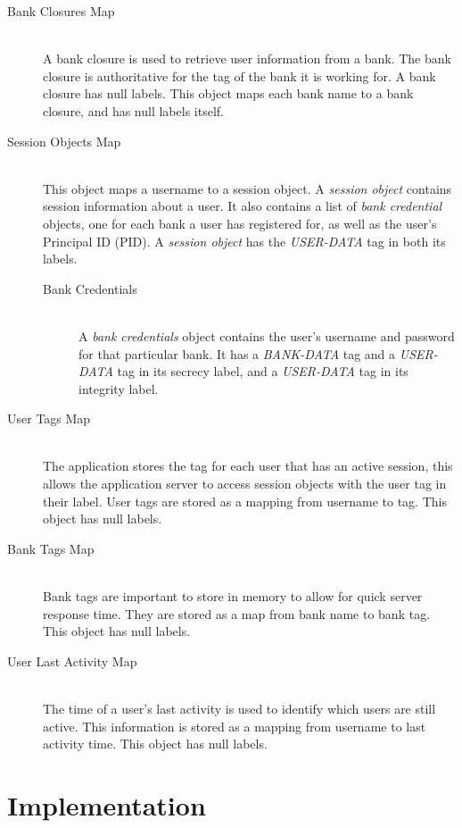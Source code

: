 \begin{description}
  \item[Bank Closures Map] \ \\
    A bank closure is used to retrieve user
    information from a bank. The bank closure
    is authoritative for the tag of the bank
    it is working for. A bank closure has null
    labels.
    This object maps each bank name 
    to a bank closure, and has null labels itself.
  \item[Session Objects Map] \ \\
    This object maps a username to a session 
    object.
    A \emph{session object} contains session 
    information about a user. It also contains
    a list of \emph{bank credential} objects,
    one for each bank a user has registered 
    for, as well as the user's Principal ID
    (PID). 
    A \emph{session object} has the 
    \emph{USER-DATA} tag in both its labels.
    \begin{description}
      \item[Bank Credentials] \ \\ 
        A \emph{bank credentials} object contains 
        the user's username and password for that
        particular bank. It has a \emph{BANK-DATA}
        tag and a \emph{USER-DATA} tag in its 
        secrecy label, and a \emph{USER-DATA} tag
        in its integrity label.
    \end{description}
  \item[User Tags Map] \ \\
    The application stores the tag for each user 
    that has an active session, this allows the 
    application server to access session objects 
    with the user tag in their label. User tags 
    are stored as a mapping from username to tag.
    This object has null labels.
  \item[Bank Tags Map] \ \\
    Bank tags are important to store in memory to 
    allow for quick server response time. They are 
    stored as a map from bank name to bank tag.
    This object has null labels.
  \item[User Last Activity Map] \ \\
    The time of a user's last activity 
    is used to identify which users
    are still active. This information is stored 
    as a mapping from username to last activity 
    time.
    This object has null labels.
\end{description}

\section{Implementation}
\label{mint:impl}

